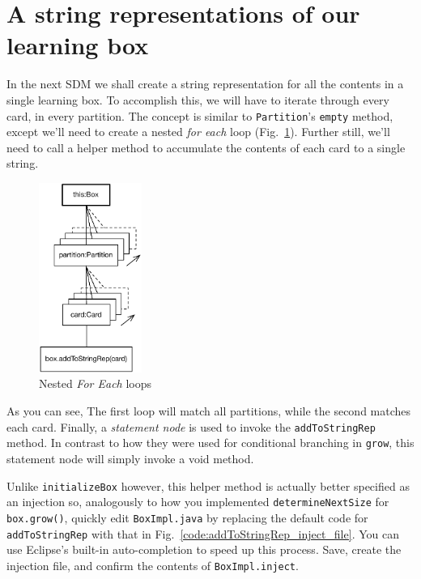 \newpage
\hypertarget{sec:stringRep}{}
\section{A string representations of our learning box}
\genHeader

In the next SDM we shall create a string representation for all the contents in a single learning box. To accomplish this, we will have to iterate through 
every card, in every partition. The concept is similar to \texttt{Partition}'s \texttt{empty} method, except we'll need to create a nested \emph{for each}
loop (Fig.~\ref{fig:goal_stringRep}). Further still, we'll need to call a helper method to accumulate the contents of each card to a single string.

\vspace{1cm}

\begin{figure}[htbp]
	\centering
	\includegraphics[width=0.3\textwidth]{goal_stringRep.pdf}
	\caption{Nested \emph{For Each} loops}
	\label{fig:goal_stringRep}
\end{figure}

\vspace{1cm}

As you can see, The first loop will match all partitions, while the second matches each card. Finally, a \emph{statement node} is used to invoke the
\texttt{addToStringRep} method. In contrast to how they were used for conditional branching in \texttt{grow}, this statement node will simply invoke a
void method.

Unlike \texttt{initializeBox} however, this helper method is actually better specified as an injection so, analogously to how you implemented
\texttt{determineNextSize} for \texttt{box.grow()}, quickly edit \texttt{BoxImpl.java} by replacing the default code for \texttt{addToStringRep} with that
in Fig.~\ref{code:addToStringRep_inject_file}. You can use Eclipse's built-in auto-completion to speed up this process. Save, create the injection file, and
confirm the contents of \texttt{BoxImpl.inject}.

